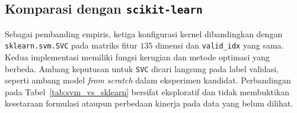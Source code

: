 \subsection{Komparasi dengan \texttt{scikit-learn}}

Sebagai pembanding empiris, ketiga konfigurasi kernel dibandingkan dengan \texttt{sklearn.svm.SVC} pada matriks fitur $135$ dimensi dan \texttt{valid\_idx} yang sama. Kedua implementasi memiliki fungsi kerugian dan metode optimasi yang berbeda. Ambang keputusan untuk \texttt{SVC} dicari langsung pada label validasi, seperti ambang model \textit{from scratch} dalam eksperimen kandidat. Perbandingan pada Tabel~\ref{tab:svm_vs_sklearn} bersifat eksploratif dan tidak membuktikan kesetaraan formulasi ataupun perbedaan kinerja pada data yang belum dilihat.

\begin{table}[H]
    \centering
    \caption{Perbandingan lengkap \texttt{SVMFromScratch} dan \texttt{sklearn.svm.SVC} pada ketiga kernel.}
    \label{tab:svm_vs_sklearn}
\end{table}
